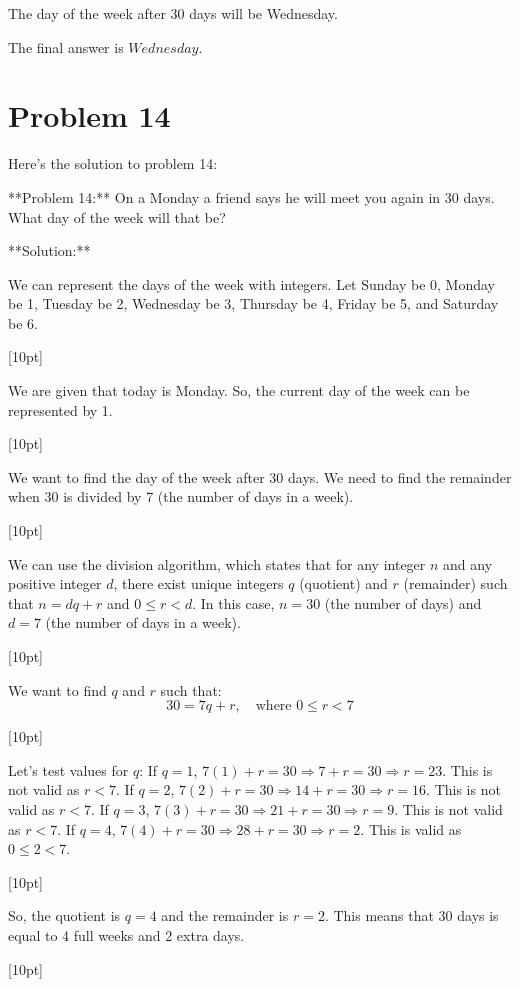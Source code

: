 \documentclass{article}
\begin{document}
The day of the week after 30 days will be Wednesday.

The final answer is $\boxed{Wednesday}$.

\newpage

\section*{Problem 14}
Here's the solution to problem 14:

**Problem 14:** On a Monday a friend says he will meet you again in 30 days. What day of the week will that be?

**Solution:**

We can represent the days of the week with integers. Let Sunday be 0, Monday be 1, Tuesday be 2, Wednesday be 3, Thursday be 4, Friday be 5, and Saturday be 6.

[10pt]

We are given that today is Monday. So, the current day of the week can be represented by 1.

[10pt]

We want to find the day of the week after 30 days. We need to find the remainder when 30 is divided by 7 (the number of days in a week).

[10pt]

We can use the division algorithm, which states that for any integer $n$ and any positive integer $d$, there exist unique integers $q$ (quotient) and $r$ (remainder) such that $n = dq + r$ and $0 \le r < d$.
In this case, $n = 30$ (the number of days) and $d = 7$ (the number of days in a week).

[10pt]

We want to find $q$ and $r$ such that:
$$30 = 7q + r, \quad \text{where } 0 \le r < 7$$

[10pt]

Let's test values for $q$:
If $q = 1$, $7(1) + r = 30 \Rightarrow 7 + r = 30 \Rightarrow r = 23$. This is not valid as $r < 7$.
If $q = 2$, $7(2) + r = 30 \Rightarrow 14 + r = 30 \Rightarrow r = 16$. This is not valid as $r < 7$.
If $q = 3$, $7(3) + r = 30 \Rightarrow 21 + r = 30 \Rightarrow r = 9$. This is not valid as $r < 7$.
If $q = 4$, $7(4) + r = 30 \Rightarrow 28 + r = 30 \Rightarrow r = 2$. This is valid as $0 \le 2 < 7$.

[10pt]

So, the quotient is $q=4$ and the remainder is $r=2$. This means that 30 days is equal to 4 full weeks and 2 extra days.

[10pt]
\end{document}
